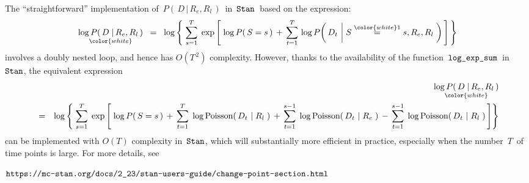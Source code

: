 \vskip 0.5cm
\begin{remark}
\mbox{}
\vskip 0.2cm
\noindent
The ``straightforward'' implementation of \,$P\!\left(\,D\,\vert\,R_{e},R_{l}\,\right)$\,
in \,$\textnormal{\texttt{Stan}}$\, based on the expression:
\begin{eqnarray*}
\underset{{\color{white}}}{\log P\!\left(\,D \;\vert\, R_{e},R_{l}\,\right)}
\;\; = \;\;
	\log\left\{\;
	\overset{T}{\underset{s=1}{\sum}}\;
	\exp\left[\;
		\log P\!\left(\,S=s\,\right)
		\, + \,
		\overset{T}{\underset{t=1}{\sum}}\,
		\log P\!\left(\,D_{t} \,\left\vert\; S\overset{{\color{white}1}}{=}s,R_{e},R_{l}\right.\,\right)
		\,\right]
	\,\right\}
\end{eqnarray*}
involves a doubly nested loop, and hence has $O(T^{\,2})$ complexity.
However, thanks to the availability of the function
\,$\textnormal{\texttt{log\_exp\_sum}}$\, in \,$\textnormal{\texttt{Stan}}$,
the equivalent expression
\begin{eqnarray*}
&&
	\underset{{\color{white}}}{\log P\!\left(\,D \;\vert\, R_{e},R_{l}\,\right)}
\\
&=&
	\log\left\{\;
	\overset{T}{\underset{s=1}{\sum}}\;
	\exp\left[\;
			\log P\!\left(\,S=s\,\right)
			\,+\,
			\overset{T}{\underset{t=1}{\sum}}\;
			\log\textnormal{Poisson}\!\left(\,D_{t} \,\left\vert\; R_{l}\right.\,\right)
			\,+\,
			\overset{s-1}{\underset{t=1}{\sum}}\;
			\log\textnormal{Poisson}\!\left(\,D_{t} \,\left\vert\; R_{e}\right.\,\right)
			\,-\,
			\overset{s-1}{\underset{t=1}{\sum}}\;
			\log\textnormal{Poisson}\!\left(\,D_{t} \,\left\vert\; R_{l}\right.\,\right)
		\,\right]
	\right\}
\end{eqnarray*}
can be implemented with $O(T)$ complexity in \,$\textnormal{\texttt{Stan}}$,
which will substantially more efficient in practice, especially when the number \,$T$\, of time points is large.
For more details, see
\begin{center}
$\textnormal{\texttt{https://mc-stan.org/docs/2\_23/stan-users-guide/change-point-section.html}}$
\end{center}
\end{remark}


